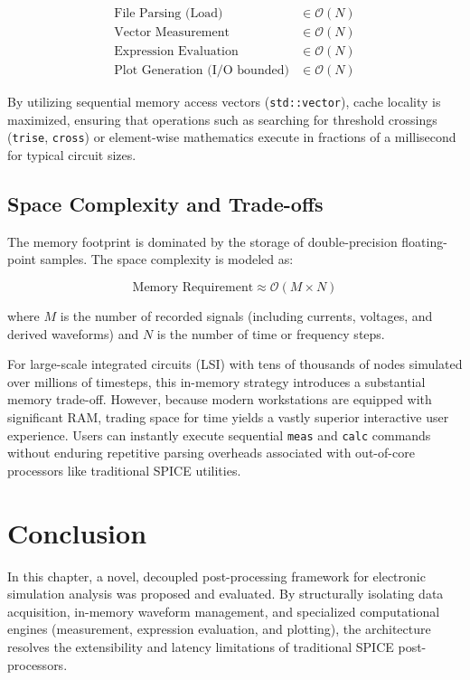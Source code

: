 \[
\begin{aligned}
\text{File Parsing (Load)} & \in \mathcal{O}(N) \\
\text{Vector Measurement} & \in \mathcal{O}(N) \\
\text{Expression Evaluation} & \in \mathcal{O}(N) \\
\text{Plot Generation (I/O bounded)} & \in \mathcal{O}(N)
\end{aligned}
\]

By utilizing sequential memory access vectors (\texttt{std::vector}), cache locality is maximized, ensuring that operations such as searching for threshold crossings (\texttt{trise}, \texttt{cross}) or element-wise mathematics execute in fractions of a millisecond for typical circuit sizes.

\subsection{Space Complexity and Trade-offs}

The memory footprint is dominated by the storage of double-precision floating-point samples. The space complexity is modeled as:

\[
\text{Memory Requirement} \approx \mathcal{O}(M \times N)
\]

where $M$ is the number of recorded signals (including currents, voltages, and derived waveforms) and $N$ is the number of time or frequency steps. 

For large-scale integrated circuits (LSI) with tens of thousands of nodes simulated over millions of timesteps, this in-memory strategy introduces a substantial memory trade-off. However, because modern workstations are equipped with significant RAM, trading space for time yields a vastly superior interactive user experience. Users can instantly execute sequential \texttt{meas} and \texttt{calc} commands without enduring repetitive parsing overheads associated with out-of-core processors like traditional SPICE utilities.

\section{Conclusion}
\label{sec:pp-summary}

In this chapter, a novel, decoupled post-processing framework for electronic simulation analysis was proposed and evaluated. By structurally isolating data acquisition, in-memory waveform management, and specialized computational engines (measurement, expression evaluation, and plotting), the architecture resolves the extensibility and latency limitations of traditional SPICE post-processors. 

